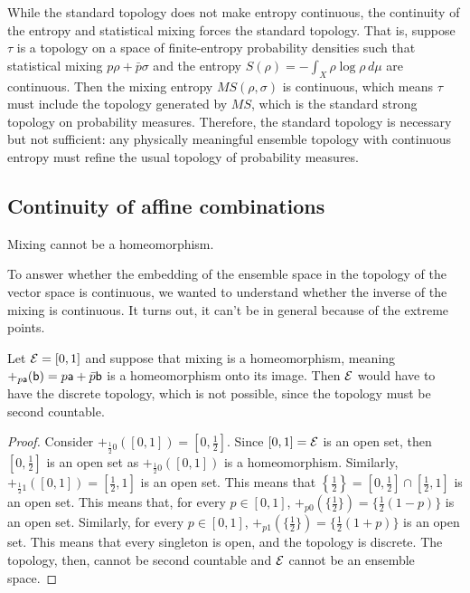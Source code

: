 While the standard topology does not make entropy continuous, the continuity of the entropy and statistical mixing forces the standard topology. That is, suppose $\tau$ is a topology on a space of finite-entropy probability densities such that statistical mixing $p\rho + \bar{p}\sigma$ and the entropy $S(\rho)=-\int_X \rho\log\rho\,d\mu$ are continuous. Then the mixing entropy $MS(\rho, \sigma)$ is continuous, which means $\tau$ must include the topology generated by $MS$, which is the standard strong topology on probability measures. Therefore, the standard topology is necessary but not sufficient: any physically meaningful ensemble topology with continuous entropy must refine the usual topology of probability measures.

\subsection{Continuity of affine combinations}

\begin{insight}
	Mixing cannot be a homeomorphism.
\end{insight}

To answer whether the embedding of the ensemble space in the topology of the vector space is continuous, we wanted to understand whether the inverse of the mixing is continuous. It turns out, it can't be in general because of the extreme points.

\begin{prop}
	Let $\Ens = [0,1]$ and suppose that mixing is a homeomorphism, meaning $+_{p \ens[a]}(\ens[b]) = p\ens[a] + \bar{p}\ens[b]$ is a homeomorphism onto its image. Then $\Ens$ would have to have the discrete topology, which is not possible, since the topology must be second countable.
\end{prop}

\begin{proof}
	Consider $+_{\frac{1}{2}0}([0,1])= [0,\frac{1}{2}]$. Since $[0,1] = \Ens$ is an open set, then $[0,\frac{1}{2}]$ is an open set as $+_{\frac{1}{2}0}([0,1])$ is a homeomorphism. Similarly, $+_{\frac{1}{2}1}([0,1])= [\frac{1}{2},1]$ is an open set. This means that $\left\{\frac{1}{2}\right\} = [0,\frac{1}{2}] \cap [\frac{1}{2},1]$ is an open set. This means that, for every $p \in [0,1]$, $+_{p0}(\{\frac{1}{2}\})= \{\frac{1}{2}(1-p)\}$ is an open set. Similarly, for every $p \in [0,1]$, $+_{p1}(\{\frac{1}{2}\})= \{\frac{1}{2}(1+p)\}$ is an open set. This means that every singleton is open, and the topology is discrete. The topology, then, cannot be second countable and $\Ens$ cannot be an ensemble space.
\end{proof}

